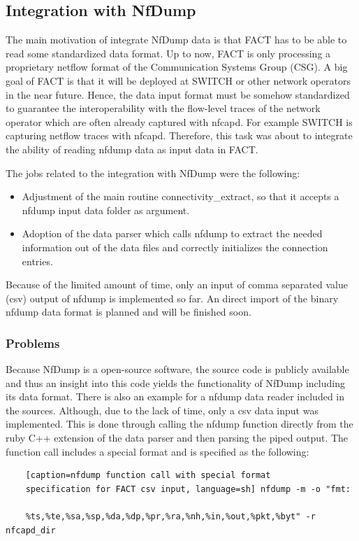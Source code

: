 \subsection{Integration with NfDump} The main motivation of integrate NfDump
data is that FACT has to be able to read some standardized data format. Up to
now, FACT is only processing a proprietary netflow format of the Communication
Systems Group (CSG). A big goal of FACT is that it will be deployed at SWITCH or
other network operators in the near future. Hence, the data input format must be
somehow standardized to guarantee the interoperability with the flow-level
traces of the network operator which are often already captured with nfcapd. For
example SWITCH is capturing netflow traces with nfcapd. Therefore, this task was
about to integrate the ability of reading nfdump data as input data in FACT.

The jobs related to the integration with NfDump were the following:
\begin{itemize}
	\item Adjustment of the main routine connectivity\_extract, so
	that it accepts a nfdump input data folder as argument.
	\item Adoption of the data parser which calls nfdump to extract the needed
	information out of the data files and correctly initializes the connection
	entries.
\end{itemize}

Because of the limited amount of time, only an input of comma separated value
(csv) output of nfdump is implemented so far. An direct import of the binary
nfdump data format is planned and will be finished soon.

\subsubsection{Problems} Because NfDump is a open-source software, the source
code is publicly available and thus an insight into this code yields the
functionality of NfDump including its data format. There is also an example for
a nfdump data reader included in the sources. Although, due to the lack of time,
only a csv data input was implemented. This is done through calling the nfdump
function directly from the ruby C++ extension of the data parser and then
parsing the piped output. The function call includes a special format and is
specified as the following:
\begin{lstlisting}
	[caption=nfdump function call with special format
	specification for FACT csv input, language=sh] nfdump -m -o "fmt:
	
	%ts,%te,%sa,%sp,%da,%dp,%pr,%ra,%nh,%in,%out,%pkt,%byt" -r nfcapd_dir
\end{lstlisting}

